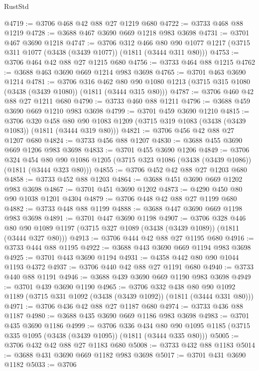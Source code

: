 \begin{lexlean}{RustStd}
\begin{coremodule}
@4719 := @3706 @468 @42 @88 @27 @1219 @680
@4722 := @3733 @468 @88 @1219
@4728 := @3688 @467 @3690 @669 @1218 @983 @3698
@4731 := @3701 @467 @3690 @1218
@4747 := @3706
    @312
    @466
    @80
    @90
    @1077
    @1217
    (@3715 @311 @1077 (@3438 (@3439 @1077)) (@1811 (@3444 @311 @80)))
@4753 := @3706 @464 @42 @88 @27 @1215 @680
@4756 := @3733 @464 @88 @1215
@4762 := @3688 @463 @3690 @669 @1214 @983 @3698
@4765 := @3701 @463 @3690 @1214
@4781 := @3706
    @316
    @462
    @80
    @90
    @1080
    @1213
    (@3715 @315 @1080 (@3438 (@3439 @1080)) (@1811 (@3444 @315 @80)))
@4787 := @3706 @460 @42 @88 @27 @1211 @680
@4790 := @3733 @460 @88 @1211
@4796 := @3688 @459 @3690 @669 @1210 @983 @3698
@4799 := @3701 @459 @3690 @1210
@4815 := @3706
    @320
    @458
    @80
    @90
    @1083
    @1209
    (@3715 @319 @1083 (@3438 (@3439 @1083)) (@1811 (@3444 @319 @80)))
@4821 := @3706 @456 @42 @88 @27 @1207 @680
@4824 := @3733 @456 @88 @1207
@4830 := @3688 @455 @3690 @669 @1206 @983 @3698
@4833 := @3701 @455 @3690 @1206
@4849 := @3706
    @324
    @454
    @80
    @90
    @1086
    @1205
    (@3715 @323 @1086 (@3438 (@3439 @1086)) (@1811 (@3444 @323 @80)))
@4855 := @3706 @452 @42 @88 @27 @1203 @680
@4858 := @3733 @452 @88 @1203
@4864 := @3688 @451 @3690 @669 @1202 @983 @3698
@4867 := @3701 @451 @3690 @1202
@4873 := @4290 @450 @80 @90 @1038 @1201 @4304
@4879 := @3706 @448 @42 @88 @27 @1199 @680
@4882 := @3733 @448 @88 @1199
@4888 := @3688 @447 @3690 @669 @1198 @983 @3698
@4891 := @3701 @447 @3690 @1198
@4907 := @3706
    @328
    @446
    @80
    @90
    @1089
    @1197
    (@3715 @327 @1089 (@3438 (@3439 @1089)) (@1811 (@3444 @327 @80)))
@4913 := @3706 @444 @42 @88 @27 @1195 @680
@4916 := @3733 @444 @88 @1195
@4922 := @3688 @443 @3690 @669 @1194 @983 @3698
@4925 := @3701 @443 @3690 @1194
@4931 := @4358 @442 @80 @90 @1044 @1193 @4372
@4937 := @3706 @440 @42 @88 @27 @1191 @680
@4940 := @3733 @440 @88 @1191
@4946 := @3688 @439 @3690 @669 @1190 @983 @3698
@4949 := @3701 @439 @3690 @1190
@4965 := @3706
    @332
    @438
    @80
    @90
    @1092
    @1189
    (@3715 @331 @1092 (@3438 (@3439 @1092)) (@1811 (@3444 @331 @80)))
@4971 := @3706 @436 @42 @88 @27 @1187 @680
@4974 := @3733 @436 @88 @1187
@4980 := @3688 @435 @3690 @669 @1186 @983 @3698
@4983 := @3701 @435 @3690 @1186
@4999 := @3706
    @336
    @434
    @80
    @90
    @1095
    @1185
    (@3715 @335 @1095 (@3438 (@3439 @1095)) (@1811 (@3444 @335 @80)))
@5005 := @3706 @432 @42 @88 @27 @1183 @680
@5008 := @3733 @432 @88 @1183
@5014 := @3688 @431 @3690 @669 @1182 @983 @3698
@5017 := @3701 @431 @3690 @1182
@5033 := @3706

\end{coremodule}
\end{lexlean}
